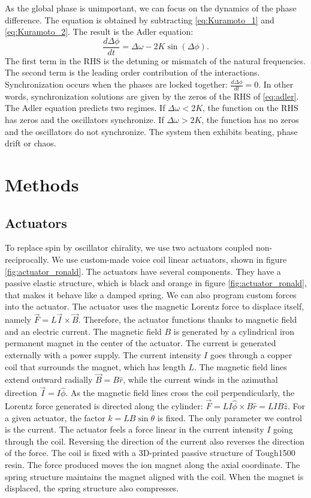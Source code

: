\documentclass[11pt, a4paper]{article} %
\newcommand{\Th}{\theta}
\begin{document}
As the global phase is unimportant, we can focus on the dynamics of the phase difference.
The equation is obtained by subtracting \eqref{eq:Kuramoto_1} and \eqref{eq:Kuramoto_2}. 
The result is the Adler equation:
\begin{equation}
    \frac{d \Delta \phi }{dt} = \Delta \omega - 2 K \sin(\Delta \phi).
    \label{eq:adler}
\end{equation}
The first term in the RHS is the detuning or mismatch of the natural frequencies. The second term is the 
leading order contribution of the interactions. 
Synchronization occurs when the phases are locked together: $\frac{d \Delta \phi }{dt}=0$. In other words, 
synchronization solutions are given by the zeros of the RHS of \eqref{eq:adler}. The Adler equation 
predicts two regimes. If $\Delta \omega <2K$, the function on the RHS has zeros and the oscillators synchronize. 
If $\Delta \omega >2K$, the function has no zeros and the oscillators do not synchronize. The system then 
exhibits beating, phase drift or chaos. 

\section{Methods}
\label{sec:methods}

\subsection{Actuators}
\label{subsec:actuators}

To replace spin by oscillator chirality, we use two actuators coupled non-reciprocally. 
We use custom-made voice coil linear actuators, shown in figure \ref{fig:actuator_ronald}.
The actuators have several components. They have a passive elastic structure, which is black and orange 
in figure \ref{fig:actuator_ronald}, that makes it behave like a damped spring. 
We can also program custom forces into the actuator. The actuator uses the magnetic Lorentz force to   %
displace itself, namely $\vec{F}=L\vec{I}\times \vec{B}$. Therefore, the actuator functions thanks to magnetic field and an electric current. 
The magnetic field $B$ is generated by a cylindrical iron permanent magnet in the center of the actuator.
The current is generated externally with a power supply. The current intensity $I$ goes through a copper coil that surrounds the magnet, 
which has length $L$. The magnetic field lines extend outward radially $\vec{B}=B\hat{r}$, 
while the current winds in the azimuthal direction $\vec{I}=I\hat{\phi}$.
As the magnetic field lines cross the coil perpendicularly, the Lorentz force generated is directed 
along the cylinder: $\vec{F}=LI\hat{\phi}\times B\hat{r}=LIB\hat{z}$.
For a given actuator, the factor $k=LB\sin{\Th}$ is fixed. The only parameter we control is the current. 
The actuator feels a force linear in the current intensity $I$ going through the coil. 
Reversing the direction of the current also reverses the direction of the force. 
The coil is fixed with a 3D-printed passive structure of Tough1500 resin. 
The force produced moves the ion magnet along the axial coordinate. The spring structure 
maintains the magnet aligned with the coil. When the magnet is displaced, the spring structure also compresses. 
\end{document}
